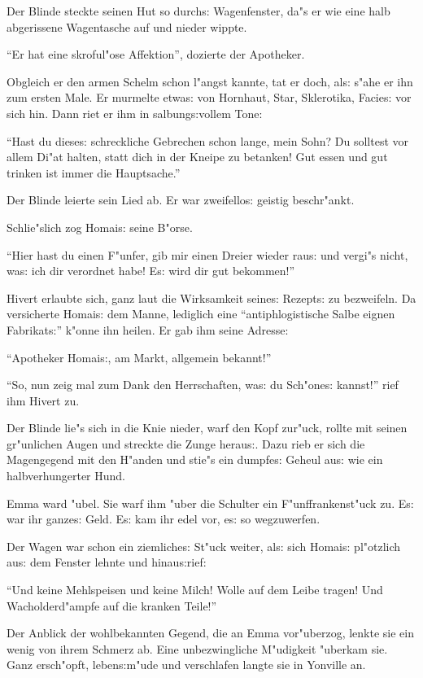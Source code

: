 \documentclass[oneside,12pt]{book}
\newcommand{\s}{s:}%
\begin{document}
Der Blinde steckte seinen Hut so durch{\s} Wagenfenster, da"s er
wie eine halb abgerissene Wagentasche auf und nieder wippte.

"`Er hat eine skroful"ose Affektion"', dozierte der Apotheker.

Obgleich er den armen Schelm schon l"angst kannte, tat er doch,
al{\s} s"ahe er ihn zum ersten Male. Er murmelte etwa{\s} von
Hornhaut, Star, Sklerotika, Facie{\s} vor sich hin. Dann riet er
ihm in salbung{\s}vollem Tone:

"`Hast du diese{\s} schreckliche Gebrechen schon lange, mein Sohn?
Du solltest vor allem Di"at halten, statt dich in der Kneipe zu
betanken! Gut essen und gut trinken ist immer die Hauptsache."'

Der Blinde leierte sein Lied ab. Er war zweifello{\s} geistig
beschr"ankt.

Schlie"slich zog Homai{\s} seine B"orse.

"`Hier hast du einen F"unfer, gib mir einen Dreier wieder rau{\s}
und vergi"s nicht, wa{\s} ich dir verordnet habe! E{\s} wird dir
gut bekommen!"'

Hivert erlaubte sich, ganz laut die Wirksamkeit seine{\s}
Rezept{\s} zu bezweifeln. Da versicherte Homai{\s} dem Manne,
lediglich eine "`antiphlogistische Salbe eignen Fabrikat{\s}"'
k"onne ihn heilen. Er gab ihm seine Adresse:

"`Apotheker Homai{\s}, am Markt, allgemein bekannt!"'

"`So, nun zeig mal zum Dank den Herrschaften, wa{\s} du
Sch"one{\s} kannst!"' rief ihm Hivert zu.

Der Blinde lie"s sich in die Knie nieder, warf den Kopf zur"uck,
rollte mit seinen gr"unlichen Augen und streckte die Zunge
herau{\s}. Dazu rieb er sich die Magengegend mit den H"anden und
stie"s ein dumpfe{\s} Geheul au{\s} wie ein halbverhungerter Hund.

Emma ward "ubel. Sie warf ihm "uber die Schulter ein
F"unf\/frankenst"uck zu. E{\s} war ihr ganze{\s} Geld. E{\s} kam
ihr edel vor, e{\s} so wegzuwerfen.

Der Wagen war schon ein ziemliche{\s} St"uck weiter, al{\s} sich
Homai{\s} pl"otzlich au{\s} dem Fenster lehnte und hinau{\s}rief:

"`Und keine Mehlspeisen und keine Milch! Wolle auf dem Leibe
tragen! Und Wacholderd"ampfe auf die kranken Teile!"'

Der Anblick der wohlbekannten Gegend, die an Emma vor"uberzog,
lenkte sie ein wenig von ihrem Schmerz ab. Eine unbezwingliche
M"udigkeit "uberkam sie. Ganz ersch"opft, leben{\s}m"ude und
verschlafen langte sie in Yonville an.
\end{document}
